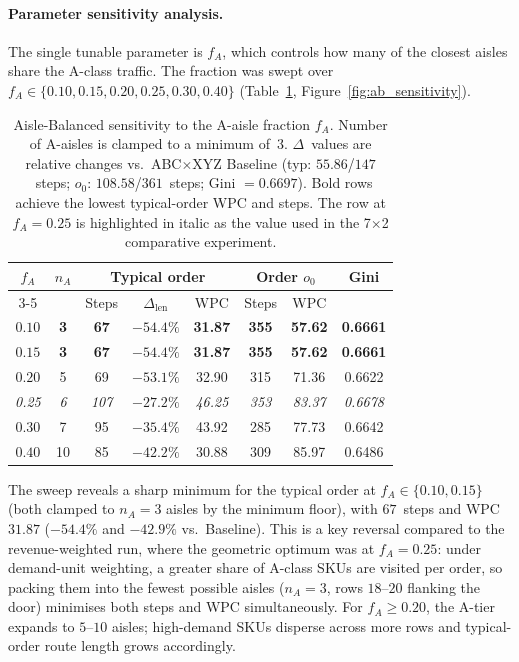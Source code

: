 \documentclass[12pt,a4paper]{article}
\begin{document}
\paragraph{Parameter sensitivity analysis.}
The single tunable parameter is $f_A$, which controls how many of the closest
aisles share the A-class traffic.
The fraction was swept over $f_A \in \{0.10, 0.15, 0.20, 0.25, 0.30, 0.40\}$
(Table~\ref{tab:ab_frac}, Figure~\ref{fig:ab_sensitivity}).

\begin{table}[H]
\centering
\caption{Aisle-Balanced sensitivity to the A-aisle fraction $f_A$. Number of
  A-aisles is clamped to a minimum of~$3$. $\Delta$~values are relative changes
  vs.\ ABC$\times$XYZ Baseline (typ: $55.86$/$147$~steps; $o_0$: $108.58$/$361$~steps;
  Gini $=0.6697$). Bold rows achieve the lowest typical-order WPC and steps.
  The row at $f_A = 0.25$ is highlighted in italic as the value used in
  the 7$\times$2 comparative experiment.}
\label{tab:ab_frac}
\renewcommand{\arraystretch}{1.20}
\begin{tabular}{cccccccc}
\hline
\multirow{2}{*}{$f_A$} & \multirow{2}{*}{$n_A$} & \multicolumn{3}{c}{Typical order} & \multicolumn{2}{c}{Order $o_0$} & \multirow{2}{*}{Gini} \\
\cline{3-5}\cline{6-7}
 & & Steps & $\Delta_\mathrm{len}$ & WPC & Steps & WPC & \\
\hline
$\mathbf{0.10}$ & \textbf{3}  & \textbf{67} & $\mathbf{-54.4\%}$ & \textbf{31.87} & \textbf{355} & \textbf{57.62} & \textbf{0.6661} \\
$\mathbf{0.15}$ & \textbf{3}  & \textbf{67} & $\mathbf{-54.4\%}$ & \textbf{31.87} & \textbf{355} & \textbf{57.62} & \textbf{0.6661} \\
$0.20$ & 5  & 69 & $-53.1\%$ & 32.90 & 315 & 71.36 & 0.6622 \\
\textit{0.25} & \textit{6}  & \textit{107} & \textit{$-27.2\%$} & \textit{46.25} & \textit{353} & \textit{83.37} & \textit{0.6678} \\
$0.30$ & 7  & 95 & $-35.4\%$ & 43.92 & 285 & 77.73 & 0.6642 \\
$0.40$ & 10 & 85 & $-42.2\%$ & 30.88 & 309 & 85.97 & 0.6486 \\
\hline
\end{tabular}
\end{table}

The sweep reveals a sharp minimum for the typical order at
$f_A \in \{0.10, 0.15\}$ (both clamped to $n_A = 3$ aisles by the minimum
floor), with $67$~steps and WPC~$31.87$ ($-54.4\%$ and $-42.9\%$ vs.\ Baseline).
This is a key reversal compared to the revenue-weighted run, where the geometric
optimum was at $f_A = 0.25$: under demand-unit weighting, a greater share
of A-class SKUs are visited per order, so packing them into the fewest
possible aisles ($n_A = 3$, rows $18$--$20$ flanking the door) minimises
both steps and WPC simultaneously.
For $f_A \ge 0.20$, the A-tier expands to $5$--$10$ aisles; high-demand
SKUs disperse across more rows and typical-order route length grows accordingly.
\end{document}
